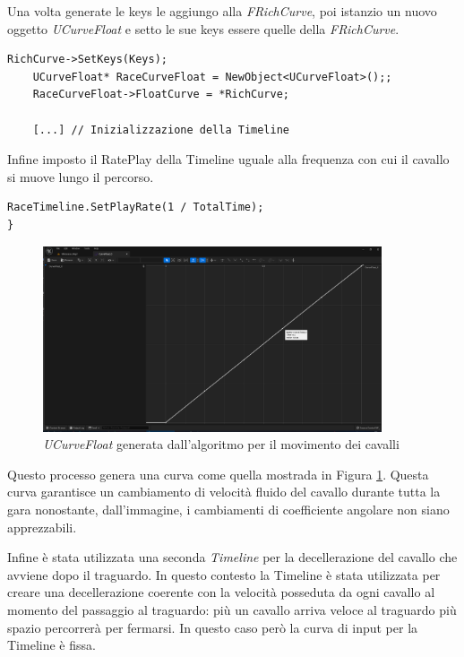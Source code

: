         Una volta generate le keys le aggiungo alla \textit{FRichCurve}, poi istanzio un nuovo oggetto \textit{UCurveFloat} e setto le sue keys essere quelle della \textit{FRichCurve}.

        \begin{lstlisting}[firstnumber=40]
    RichCurve->SetKeys(Keys);
    UCurveFloat* RaceCurveFloat = NewObject<UCurveFloat>();;
    RaceCurveFloat->FloatCurve = *RichCurve;

    [...] // Inizializzazione della Timeline
        \end{lstlisting}

        Infine imposto il RatePlay della Timeline uguale alla frequenza con cui il cavallo si muove lungo il percorso.

        \begin{lstlisting}[firstnumber=46]
    RaceTimeline.SetPlayRate(1 / TotalTime);	
}
        \end{lstlisting}

        \begin{figure}[!ht]
            \centering
            \includegraphics[width=10cm]{figure/FloatCurve.png}
            \caption{\textit{UCurveFloat} generata dall'algoritmo per il movimento dei cavalli}
            \label{fig:CurveFloat}
        \end{figure}

        Questo processo genera una curva come quella mostrada in Figura \ref{fig:CurveFloat}.
        Questa curva garantisce un cambiamento di velocità fluido del cavallo durante tutta la gara nonostante, dall'immagine, i cambiamenti di coefficiente angolare non siano apprezzabili.

        Infine è stata utilizzata una seconda \textit{Timeline} per la decellerazione del cavallo che avviene dopo il traguardo.
        In questo contesto la Timeline è stata utilizzata per creare una decellerazione coerente con la velocità posseduta da ogni cavallo al momento del passaggio al traguardo: più un cavallo arriva veloce al traguardo più spazio percorrerà per fermarsi.
        In questo caso però la curva di input per la Timeline è fissa. 

